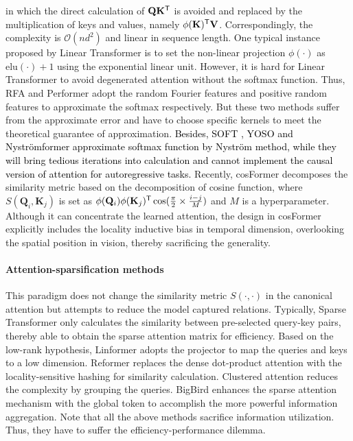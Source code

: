 \documentclass[nohyperref]{article}
\theoremstyle{plain}
\theoremstyle{definition}
\theoremstyle{remark}
\newcommand{\update}[1]{{\textcolor{black}{#1}}}
\begin{document}
in which the direct calculation of $\mathbf{Q}\mathbf{K}^{\sf T}$ is avoided and replaced by the multiplication of keys and values, namely $\phi(\mathbf{K})^{\sf T}\mathbf{V}$. Correspondingly, the complexity is $\mathcal{O}(nd^2)$ and linear in sequence length. One typical instance proposed by Linear Transformer \cite{Katharopoulos2020TransformersAR} is to set the non-linear projection $\phi(\cdot)$ as $\text{elu}(\cdot)+1$ using the exponential linear unit. However, it is hard for Linear Transformer to avoid degenerated attention without the softmax function. Thus, RFA \cite{Peng2021RandomFA} and Performer \cite{performer} adopt the random Fourier features \cite{Rahimi2007RandomFF} and positive random features to approximate the softmax respectively. But these two methods suffer from the approximate error and have to choose specific kernels to meet the theoretical guarantee of approximation. \update{Besides, SOFT \cite{Lu2021SOFTST}, YOSO \cite{zeng2021yoso} and Nystr{\"o}mformer \cite{Xiong2021NystrmformerAN} approximate softmax function by Nystr{\"o}m method, while they will bring tedious iterations into calculation and cannot implement the causal version of attention for autoregressive tasks.} Recently, cosFormer \cite{anonymous2022cosformer} decomposes the similarity metric based on the decomposition of cosine function, where $S(\mathbf{Q}_{i},\mathbf{K}_{j})$ is set as $\phi(\mathbf{Q}_{i})\phi(\mathbf{K}_{j})^{\sf T}\cos(\frac{\pi}{2}\times\frac{i-j}{M})$ and $M$ is a hyperparameter. Although it can concentrate the learned attention, the design in cosFormer explicitly includes the locality inductive bias in temporal dimension, overlooking the spatial position in vision, thereby sacrificing the generality.

\vspace{-10pt}
\paragraph{Attention-sparsification methods} 
This paradigm does not change the similarity metric $S(\cdot, \cdot)$ in the canonical attention but attempts to reduce the model captured relations. Typically, Sparse Transformer \cite{Child2019GeneratingLS} only calculates the similarity between pre-selected query-key pairs, thereby able to obtain the sparse attention matrix for efficiency. Based on the low-rank hypothesis, Linformer \cite{Wang2020LinformerSW} adopts the projector to map the queries and keys to a low dimension. Reformer \cite{kitaev2020reformer} replaces the dense dot-product attention with the locality-sensitive hashing for similarity calculation. Clustered attention \cite{Vyas2020FastTW} reduces the complexity by grouping the queries. BigBird \cite{Zaheer2020BigBT} enhances the sparse attention mechanism with the global token to accomplish the more powerful information aggregation. Note that all the above methods sacrifice information utilization. Thus, they have to suffer the efficiency-performance dilemma. 
\end{document}
